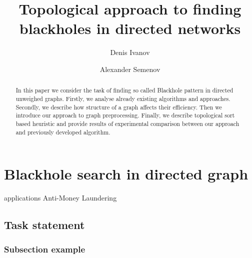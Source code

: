 \documentclass{svproc}
\begin{document}
\mainmatter              %
%
\title{Topological approach to finding blackholes in directed networks}
%
%
\author{Denis Ivanov \and Alexander Semenov}
%
%
%

\maketitle              %

\begin{abstract}
In this paper we consider the task of finding so called Blackhole pattern in directed unweighed graphs.
Firstly, we analyse already existing algorithms and approaches. Secondly, we describe how structure of a graph
affects their efficiency. Then we introduce our approach to graph preprocessing. Finally, we describe topological sort based heuristic
and provide results of experimental comparison between our approach and previously developed algorithm.
\end{abstract}
%
\section{Blackhole search in directed graph}
applications Anti-Money Laundering \cite{semenov2017survey}

%
\subsection{Task statement}
%

%
\subsubsection{Subsection example}
%
\end{document}
